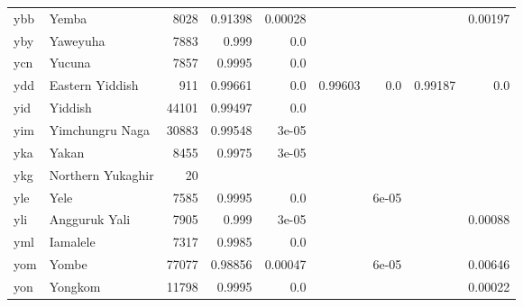 \documentclass[11pt]{article}
\begin{document}
\begin{table*}[h]
{\begin{tabular}{llrrrrrrr}
ybb         & Yemba         & 8028         & 0.91398         & 0.00028         &          &          &          & 0.00197         \\

yby         & Yaweyuha         & 7883         & 0.999         & 0.0         &          &          &          &          \\

ycn         & Yucuna         & 7857         & 0.9995         & 0.0         &          &          &          &          \\

ydd         & Eastern Yiddish         & 911         & 0.99661         & 0.0         & 0.99603         & 0.0         & 0.99187         & 0.0         \\

yid         & Yiddish         & 44101         & 0.99497         & 0.0         &          &          &          &          \\

yim         & Yimchungru Naga         & 30883         & 0.99548         & 3e-05         &          &          &          &          \\

yka         & Yakan         & 8455         & 0.9975         & 3e-05         &          &          &          &          \\

ykg         & Northern Yukaghir         & 20         &          &          &          &          &          &          \\

yle         & Yele         & 7585         & 0.9995         & 0.0         &          & 6e-05         &          &          \\

yli         & Angguruk Yali         & 7905         & 0.999         & 3e-05         &          &          &          & 0.00088         \\

yml         & Iamalele         & 7317         & 0.9985         & 0.0         &          &          &          &          \\

yom         & Yombe         & 77077         & 0.98856         & 0.00047         &          & 6e-05         &          & 0.00646         \\

yon         & Yongkom         & 11798         & 0.9995         & 0.0         &          &          &          & 0.00022         \\


\end{tabular}}
\end{table*}
\end{document}
